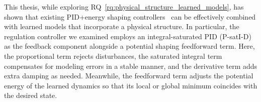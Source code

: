 This thesis, while exploring \gls{RQ}~\ref{rq:physical_structure_learned_models}, has shown that existing PID+energy shaping controllers~\citep{kelly1995tuning, kelly1996class, kelly1998global, sciavicco2012modelling, della2023model} can be effectively combined with learned models that incorporate a physical structure. In particular, the regulation controller we examined employs an integral-saturated PID (P-satI-D)~\citep{pustina2022p} as the feedback component alongside a potential shaping feedforward term. Here, the proportional term rejects disturbances, the saturated integral term compensates for modeling errors in a stable manner, and the derivative term adds extra damping as needed. Meanwhile, the feedforward term adjusts the potential energy of the learned dynamics so that its local or global minimum coincides with the desired state.

